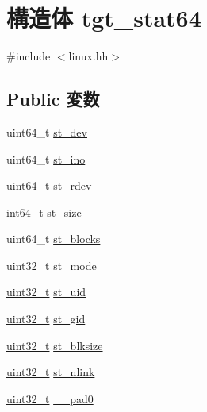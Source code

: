 \hypertarget{structLinux_1_1tgt__stat64}{
\section{構造体 tgt\_\-stat64}
\label{structLinux_1_1tgt__stat64}
}


{\ttfamily \#include $<$linux.hh$>$}\subsection*{Public 変数}
\begin{DoxyCompactItemize}
\item 
uint64\_\-t \hyperlink{structLinux_1_1tgt__stat64_a0146849d3da5c91d9776888b14b82dcc}{st\_\-dev}
\item 
uint64\_\-t \hyperlink{structLinux_1_1tgt__stat64_abb54f0e7d91659ba9f4ab77a5392c08a}{st\_\-ino}
\item 
uint64\_\-t \hyperlink{structLinux_1_1tgt__stat64_ac430407fd3b0e421da1ee8f66c95a786}{st\_\-rdev}
\item 
int64\_\-t \hyperlink{structLinux_1_1tgt__stat64_aec608d79c93ed6d010aec9f7487e0064}{st\_\-size}
\item 
uint64\_\-t \hyperlink{structLinux_1_1tgt__stat64_a72c24b54949be7eaac849d71fc056a3c}{st\_\-blocks}
\item 
\hyperlink{Type_8hh_a435d1572bf3f880d55459d9805097f62}{uint32\_\-t} \hyperlink{structLinux_1_1tgt__stat64_a75f55d064ed3b380b0315de36e178885}{st\_\-mode}
\item 
\hyperlink{Type_8hh_a435d1572bf3f880d55459d9805097f62}{uint32\_\-t} \hyperlink{structLinux_1_1tgt__stat64_ad5477a292a4edf27aa5766e01e0f5d1f}{st\_\-uid}
\item 
\hyperlink{Type_8hh_a435d1572bf3f880d55459d9805097f62}{uint32\_\-t} \hyperlink{structLinux_1_1tgt__stat64_a1faa6012541b83fd5218e2b229f876ec}{st\_\-gid}
\item 
\hyperlink{Type_8hh_a435d1572bf3f880d55459d9805097f62}{uint32\_\-t} \hyperlink{structLinux_1_1tgt__stat64_a952cc52eb5efd16f9cebffe863823593}{st\_\-blksize}
\item 
\hyperlink{Type_8hh_a435d1572bf3f880d55459d9805097f62}{uint32\_\-t} \hyperlink{structLinux_1_1tgt__stat64_ab77c257c135fa586e930ef0bf0977c08}{st\_\-nlink}
\item 
\hyperlink{Type_8hh_a435d1572bf3f880d55459d9805097f62}{uint32\_\-t} \hyperlink{structLinux_1_1tgt__stat64_a8a67e7e5a583fb9e94edf6f27d30cb09}{\_\-\_\-pad0}
\item 

\end{DoxyCompactItemize}
